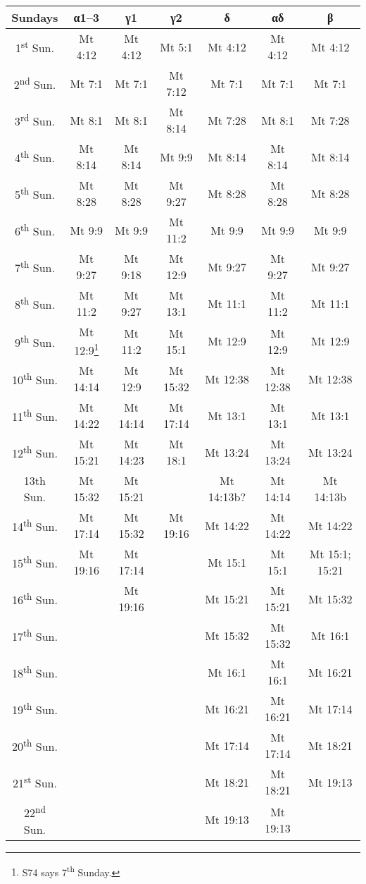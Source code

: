 \begin{tabular}{ccccccc} 
\toprule
 Sundays & α1--3 & γ1 & γ2 & δ & αδ & β \\
\midrule

 1\textsuperscript{st} Sun. & Mt 4:12 & Mt 4:12 & Mt 5:1 & Mt 4:12 & Mt 4:12 & Mt 4:12 \\
 2\textsuperscript{nd} Sun. & Mt 7:1 & Mt 7:1 & Mt 7:12 & Mt 7:1 & Mt 7:1 & Mt 7:1 \\
 3\textsuperscript{rd} Sun. & Mt 8:1 & Mt 8:1 & Mt 8:14 & Mt 7:28 & Mt 8:1 & Mt 7:28 \\
 4\textsuperscript{th} Sun. & Mt 8:14 & Mt 8:14 & Mt 9:9 & Mt 8:14 & Mt 8:14 & Mt 8:14 \\
 5\textsuperscript{th} Sun. & Mt 8:28 & Mt 8:28 & Mt 9:27 & Mt 8:28 & Mt 8:28 & Mt 8:28 \\
 6\textsuperscript{th} Sun. & Mt 9:9 & Mt 9:9 & Mt 11:2 & Mt 9:9 & Mt 9:9 & Mt 9:9 \\
 7\textsuperscript{th} Sun. & Mt 9:27 & Mt 9:18 & Mt 12:9 & Mt 9:27 & Mt 9:27 & Mt 9:27 \\
 8\textsuperscript{th} Sun. & Mt 11:2 & Mt 9:27 & Mt 13:1 & Mt 11:1 & Mt 11:2 & Mt 11:1 \\
 9\textsuperscript{th} Sun. & Mt 12:9\footnote{S74 says 7\textsuperscript{th} Sunday.} & Mt 11:2 & Mt 15:1 & Mt 12:9 & Mt 12:9 & Mt 12:9 \\
 10\textsuperscript{th} Sun. & Mt 14:14 & Mt 12:9 & Mt 15:32 & Mt 12:38 & Mt 12:38 & Mt 12:38 \\
 11\textsuperscript{th} Sun. & Mt 14:22 & Mt 14:14 & Mt 17:14 & Mt 13:1 & Mt 13:1 & Mt 13:1 \\
 12\textsuperscript{th} Sun. & Mt 15:21 & Mt 14:23 & Mt 18:1 & Mt 13:24 & Mt 13:24 & Mt 13:24 \\
 13th Sun. & Mt 15:32 & Mt 15:21 & & Mt 14:13b? & Mt 14:14 & Mt 14:13b \\
 14\textsuperscript{th} Sun. & Mt 17:14 & Mt 15:32 & Mt 19:16 & Mt 14:22 & Mt 14:22 & Mt 14:22 \\
 15\textsuperscript{th} Sun. & Mt 19:16 & Mt 17:14 & & Mt 15:1 & Mt 15:1 & Mt 15:1; 15:21 \\
 16\textsuperscript{th} Sun. & & Mt 19:16 & & Mt 15:21 & Mt 15:21 & Mt 15:32 \\
 17\textsuperscript{th} Sun. & & & & Mt 15:32 & Mt 15:32 & Mt 16:1 \\
 18\textsuperscript{th} Sun. & & & & Mt 16:1 & Mt 16:1 & Mt 16:21 \\
 19\textsuperscript{th} Sun. & & & & Mt 16:21 & Mt 16:21 & Mt 17:14 \\
 20\textsuperscript{th} Sun. & & & & Mt 17:14 & Mt 17:14 & Mt 18:21 \\
 21\textsuperscript{st} Sun. & & & & Mt 18:21 & Mt 18:21 & Mt 19:13 \\
 22\textsuperscript{nd} Sun. & & & & Mt 19:13 & Mt 19:13 & \\
\bottomrule

\end{tabular}
